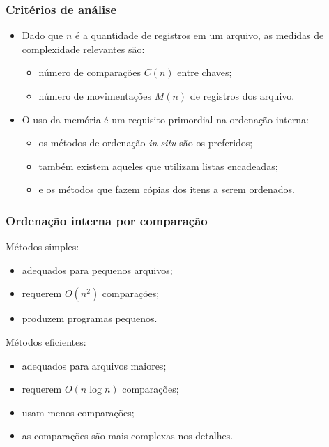 \documentclass[aspectratio=169]{beamer}
\begin{document}

\begin{frame}
\frametitle{Critérios de análise}
  \begin{itemize}
   \item Dado que $n$ é a quantidade de registros em um arquivo, as medidas de complexidade relevantes são:
    \begin{itemize}
      \item número de comparações $C(n)$ entre chaves;
      \item número de movimentações $M(n)$ de registros dos arquivo.
    \end{itemize}
    \item O uso da memória é um requisito primordial na ordenação interna:
    \begin{itemize}
      \item os métodos de ordenação {\it in situ} são os preferidos;
      \item também existem aqueles que utilizam listas encadeadas;
      \item e os métodos que fazem cópias dos itens a serem ordenados.
    \end{itemize}
  \end{itemize}    
\end{frame}


\begin{frame}
\frametitle{Ordenação interna por comparação}
\begin{block}{Métodos simples:}
    \begin{itemize}
      \item adequados para pequenos arquivos;
      \item requerem $O(n^2)$ comparações;
      \item produzem programas pequenos.
    \end{itemize}   
\end{block}
\begin{block}{Métodos eficientes:}
   \begin{itemize}
    \item adequados para arquivos maiores;
    \item requerem $O(n \log  n  )$ comparações;
    \item usam menos comparações;
    \item as comparações são mais complexas nos detalhes.
   \end{itemize} 
\end{block}
\end{frame}
\end{document}
